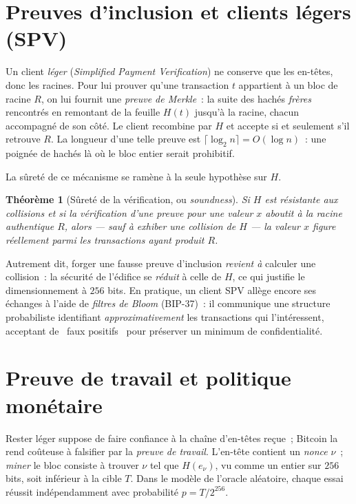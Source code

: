 \documentclass[11pt,a4paper]{article}
\theoremstyle{definition}\newtheorem{definition}{Définition}
\theoremstyle{plain}\newtheorem{theoreme}{Théorème}\newtheorem{proposition}{Proposition}
\theoremstyle{remark}\newtheorem{remarque}{Remarque}
\begin{document}
\section{Preuves d'inclusion et clients légers (SPV)}

Un client \emph{léger} (\emph{Simplified Payment Verification}) ne conserve que les en-têtes, donc
les racines. Pour lui prouver qu'une transaction $t$ appartient à un bloc de racine $R$, on lui
fournit une \emph{preuve de Merkle}~: la suite des hachés \emph{frères} rencontrés en remontant de
la feuille $H(t)$ jusqu'à la racine, chacun accompagné de son côté. Le client recombine par $H$ et
accepte si et seulement s'il retrouve $R$. La longueur d'une telle preuve est
$\lceil\log_2 n\rceil=O(\log n)$~: une poignée de hachés là où le bloc entier serait prohibitif.

La sûreté de ce mécanisme se ramène à la seule hypothèse sur $H$.

\begin{theoreme}[Sûreté de la vérification, ou \emph{soundness}]\label{th:soundness}
Si $H$ est résistante aux collisions et si la vérification d'une preuve pour une valeur $x$ aboutit
à la racine authentique $R$, alors --- sauf à exhiber une collision de $H$ --- la valeur $x$
figure réellement parmi les transactions ayant produit $R$.
\end{theoreme}

Autrement dit, forger une fausse preuve d'inclusion \emph{revient à} calculer une collision~: la
sécurité de l'édifice se \emph{réduit} à celle de $H$, ce qui justifie le dimensionnement à $256$
bits. En pratique, un client SPV allège encore ses échanges à l'aide de \emph{filtres de Bloom}
(BIP-37)~: il communique une structure probabiliste identifiant \emph{approximativement} les
transactions qui l'intéressent, acceptant de \guillemotleft~faux positifs~\guillemotright{} pour
préserver un minimum de confidentialité.

\section{Preuve de travail et politique monétaire}

Rester léger suppose de faire confiance à la chaîne d'en-têtes reçue~; Bitcoin la rend coûteuse à
falsifier par la \emph{preuve de travail}. L'en-tête contient un \emph{nonce} $\nu$~; \emph{miner}
le bloc consiste à trouver $\nu$ tel que $H(e_\nu)$, vu comme un entier sur $256$ bits, soit
inférieur à la cible $T$. Dans le modèle de l'oracle aléatoire, chaque essai réussit
indépendamment avec probabilité $p=T/2^{256}$.
\end{document}

